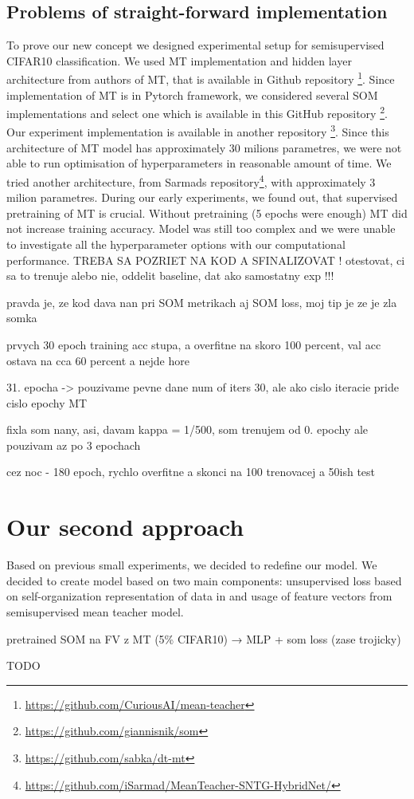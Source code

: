 \newpage

\subsection{Problems of straight-forward implementation}

To prove our new concept we designed experimental setup for semisupervised CIFAR10 classification. We used MT implementation and hidden layer architecture from authors of MT, that is available in Github repository \footnote{\url{https://github.com/CuriousAI/mean-teacher}}. Since implementation of MT is in Pytorch framework, we considered several SOM implementations and select one which is available in this GitHub repository \footnote{\url{https://github.com/giannisnik/som}}.
Our experiment implementation is available in another repository \footnote{\url{https://github.com/sabka/dt-mt}}. Since this architecture of MT model has approximately $30$ milions parametres, we were not able to run optimisation of hyperparameters in reasonable amount of time. We tried another architecture, from Sarmads repository\footnote{\url{https://github.com/iSarmad/MeanTeacher-SNTG-HybridNet/}}, with approximately $3$ milion parametres. During our early experiments, we found out, that supervised pretraining of MT is crucial. Without pretraining (5 epochs were enough) MT did not increase training accuracy. Model was still too complex and we were unable to investigate all the hyperparameter options with our computational performance.
\color{red} TREBA SA POZRIET NA KOD A SFINALIZOVAT ! otestovat, ci sa to trenuje alebo nie, oddelit baseline, dat ako samostatny exp !!! \color{black}

\color{red} pravda je, ze kod dava nan pri SOM metrikach aj SOM loss, moj tip je ze je zla somka \color{black}

\color{red} prvych 30 epoch training acc stupa, a overfitne na skoro 100 percent, val acc ostava na cca 60 percent a nejde hore\color{black}

\color{red} 31. epocha -> pouzivame pevne dane num of iters 30, ale ako cislo iteracie pride cislo epochy MT \color{black}

\color{red} fixla som nany, asi, davam kappa = 1/500, som trenujem od 0. epochy ale pouzivam az po 3 epochach \color{black}

\color{red}cez noc - 180 epoch, rychlo overfitne a skonci na 100 trenovacej a 50ish test \color{black}


\section{Our second approach}
Based on previous small experiments, we decided to redefine our model.
We decided to create model based on two main components: unsupervised loss based on self-organization representation of data in and usage of feature vectors from semisupervised mean teacher model.

pretrained SOM na FV z MT (5\% CIFAR10)
→ 
MLP + som loss (zase trojicky)


\color{red} TODO \color{black}
